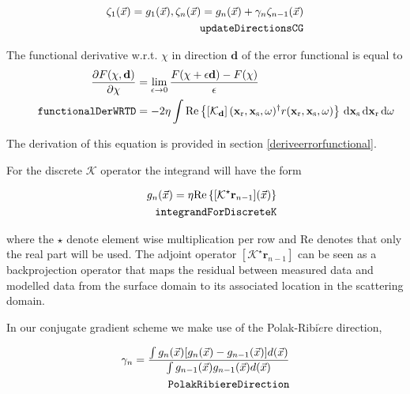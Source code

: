 \documentclass[10pt,a4paper]{article}
\newcommand{\partder}[2]{\ensuremath{\frac{\partial #1}{\partial #2}}}
\newcommand{\df}[1]{\, \ensuremath{\mbox{d}#1}}
\newcommand{\real}[1]{\text{Re} \left\{ #1 \right\}}
\newcommand{\xs}{\mathbf{x}_\text{s}}
\newcommand{\xr}{\mathbf{x}_\text{r}}
\begin{document}
\begin{align} \label{eq:updateDirectionsCG}\zeta_1(\vec{x}) = g_1(\vec{x})
,\zeta_n(\vec{x}) = g_n(\vec{x}) + \gamma_n\zeta_{n-1}(\vec{x})\\
\tag*{\texttt{updateDirectionsCG}}
\end{align}

The functional derivative w.r.t. $\chi$ in direction $\mathbf{d}$ of
the error functional is equal to
\begin{align}
\label{eq:functionalDerWRTD}
\partder{F(\mathbf{\chi}, \mathbf{d})}{\mathbf{\chi}} & =
\lim_{\epsilon \rightarrow 0} \frac{F(\mathbf{\chi} + \epsilon
\mathbf{d}) - F(\mathbf{\chi})}{\epsilon} \\
\tag*{\texttt{functionalDerWRTD}}
& = -2 \eta \int \real{\left[\mathcal{K}_\mathbf{d} \right](\xr, \xs,
\omega)^{\dagger} r (\xr, \xs, \omega)} \df{\xs} \df{\xr} \df{\omega}
\end{align}

The derivation of this equation is provided in section
\ref{deriveerrorfunctional}.

For the discrete $\mathcal{K}$ operator the integrand will have the form

\begin{align} \label{eq:integrandForDiscreteK} g_n(\vec{x}) = \eta
\real{[\mathcal{K}^\star\mathbf{r}_{n-1}](\vec{x})}\\
\tag*{\texttt{integrandForDiscreteK}}
\end{align}

where the $\star$ denote element wise multiplication per row and Re
denotes that only the real part will be used.
The adjoint operator $[\mathcal{K}^\star\mathbf{r}_{n-1}]$ can be seen
as a backprojection operator that maps the residual between measured
data and modelled data from the surface domain to its associated
location in the scattering domain.

In our conjugate gradient scheme we make use of the
Polak-Ribi$\grave{e}$re direction,

\begin{align} \label{eq:PolakRibiereDirection} \gamma_n = \frac{\int
g_n(\vec{x})[g_n(\vec{x})-g_{n-1}(\vec{x})]d(\vec{x})}{\int
g_{n-1}(\vec{x}) g_{n-1}(\vec{x})d(\vec{x})}\\
\tag*{\texttt{PolakRibiereDirection}}
\end{align}
\end{document}
